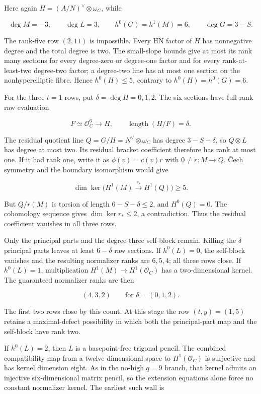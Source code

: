 \documentclass[11pt]{article}
\theoremstyle{definition}
\begin{document}
Here again \(H=(A/N)^\vee\otimes\omega_C\), while

\[\deg M=-3,\qquad \deg L=3,\qquad
h^0(G)=h^1(M)=6,\qquad \deg G=3-S.\]

The rank-five row \((2,11)\) is impossible. Every HN factor of \(H\) has
nonnegative degree and the total degree is two. The small-slope bounds
give at most its rank many sections for every degree-zero or degree-one
factor and for every rank-at-least-two degree-two factor; a degree-two
line has at most one section on the nonhyperelliptic fibre. Hence
\(h^0(H)\le5\), contrary to \(h^0(H)=h^0(G)=6\).

For the three \(t=1\) rows, put \(\delta=\deg H=0,1,2\). The six
sections have full-rank raw evaluation

\[F\simeq\mathcal O_C^6\longrightarrow H,
\qquad \operatorname{length}(H/F)=\delta.\]

The residual quotient line \(Q=G/H=N^\vee\otimes\omega_C\) has degree
\(3-S-\delta\), so \(Q\otimes L\) has degree at most two. Its residual
bracket coefficient therefore has rank at most one. If it had rank one,
write it as \(\phi(v)=c(v)r\) with \(0\ne r:M\to Q\). \v{C}ech symmetry and
the boundary isomorphism would give

\[\dim\ker\bigl(H^1(M)\xrightarrow{r_*}H^1(Q)\bigr)\ge5.\]

But \(Q/r(M)\) is torsion of length \(6-S-\delta\le2\), and
\(H^0(Q)=0\). The cohomology sequence gives \(\dim\ker r_*\le2\), a
contradiction. Thus the residual coefficient vanishes in all three rows.

Only the principal parts and the degree-three self-block remain. Killing
the \(\delta\) principal parts leaves at least \(6-\delta\) raw
sections. If \(h^0(L)=0\), the self-block vanishes and the resulting
normalizer ranks are \(6,5,4\); all three rows close. If \(h^0(L)=1\),
multiplication \(H^1(M)\to H^1(\mathcal O_C)\) has a two-dimensional
kernel. The guaranteed normalizer ranks are then

\[(4,3,2)\qquad\text{for }\delta=(0,1,2).\]

The first two rows close by this count. At this stage the row
\((t,y)=(1,5)\) retains a maximal-defect possibility in which both the
principal-part map and the self-block have rank two.

If \(h^0(L)=2\), then \(L\) is a basepoint-free trigonal pencil. The
combined compatibility map from a twelve-dimensional space to
\(H^1(\mathcal O_C)\) is surjective and has kernel dimension eight. As
in the no-high \(q=9\) branch, that kernel admits an injective
six-dimensional matrix pencil, so the extension equations alone force no
constant normalizer kernel. The earliest such wall is
\end{document}
